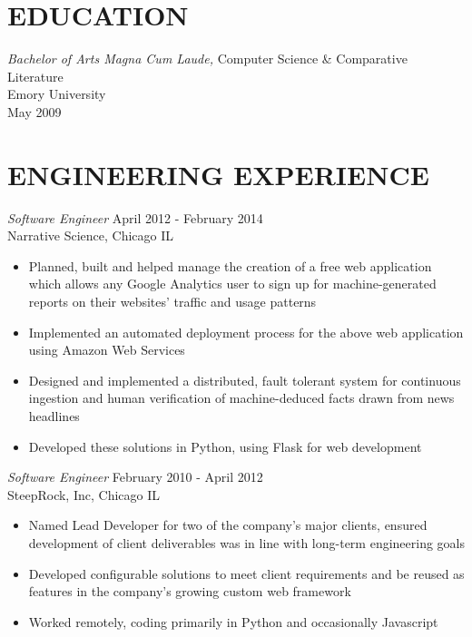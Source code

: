 \documentclass[line,margin]{res}
\begin{document}
\address{waltaskew@gmail.com}
\address{404-819-9796}

\begin{resume}
 
\section{EDUCATION}
        {\sl Bachelor of Arts Magna Cum Laude,} 
        Computer Science \& Comparative Literature \\
        Emory University \\
        May 2009
 
\section{ENGINEERING EXPERIENCE}
        {\sl Software Engineer} \hfill April 2012 - February 2014 \\
        Narrative Science, Chicago IL
        \begin{itemize} 
          \item Planned, built and helped manage the creation of a
            free web application which allows any Google Analytics
            user to sign up for machine-generated reports on their
            websites' traffic and usage patterns
          \item Implemented an automated deployment process for the
            above web application using Amazon Web Services
          \item Designed and implemented a distributed, fault tolerant
            system for continuous ingestion and human verification of
            machine-deduced facts drawn from news headlines
          \item Developed these solutions in Python, using Flask for
            web development
        \end{itemize}

        {\sl Software Engineer} \hfill February 2010 - April 2012 \\
        SteepRock, Inc, Chicago IL
        \begin{itemize}
        \item Named Lead Developer for two of the company's major
          clients, ensured development of client
          deliverables was in line with long-term engineering goals
        \item Developed configurable solutions to meet client
          requirements and be reused as features in the company's
          growing custom web framework
        \item Worked remotely, coding primarily in Python and
          occasionally Javascript
        \end{itemize}


\end{resume}
\end{document}
